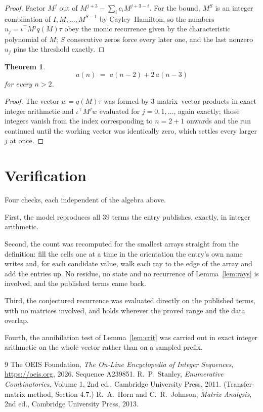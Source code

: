 \documentclass[11pt,a4paper]{article}
\theoremstyle{plain}
\newtheorem{theorem}{Theorem}
\theoremstyle{definition}
\begin{document}
\begin{proof}
Factor $M^{j}$ out of $M^{j+3}-\sum_ic_iM^{j+3-i}$. For the bound, $M^{S}$
is an integer combination of $I,M,\dots,M^{S-1}$ by Cayley--Hamilton, so the numbers
$u_j=\iota^{\!\top}M^{j}q(M)\tau$ obey the monic recurrence given by the characteristic
polynomial of $M$; $S$ consecutive zeros force every later one, and the last nonzero $u_j$
pins the threshold exactly.
\end{proof}

\begin{theorem}
\[
a(n)\;=\;a(n-2) + 2\,a(n-3)
\]
for every $n>2$.
\end{theorem}

\begin{proof}
The vector $w=q(M)\tau$ was formed by $3$ matrix--vector products in exact integer
arithmetic and $\iota^{\!\top}M^{j}w$ evaluated for $j=0,1,\dots$, again exactly; those
integers vanish from the index corresponding to $n=2+1$ onwards and the run continued
until the working vector was identically zero, which settles every larger $j$ at once.
\end{proof}

\section{Verification}

Four checks, each independent of the algebra above.

First, the model reproduces all $39$ terms the entry publishes, exactly, in integer
arithmetic.

Second, the count was recomputed for the smallest arrays straight from the definition: fill the
cells one at a time in the orientation the entry's own name writes and, for each candidate
value, walk each ray to the edge of the array and add the entries up. No residue, no state and
no recurrence of Lemma~\ref{lem:rays} is involved, and the published terms came back.

Third, the conjectured recurrence was evaluated directly on the published terms, with no
matrices involved, and holds wherever the proved range and the data overlap.

Fourth, the annihilation test of Lemma~\ref{lem:crit} was carried out in exact integer
arithmetic on the whole vector rather than on a sampled prefix.

\begin{thebibliography}{9}
 The OEIS Foundation, \emph{The On-Line Encyclopedia of Integer
Sequences}, \url{https://oeis.org}, 2026. Sequence A239851.
 R.~P.~Stanley, \emph{Enumerative Combinatorics}, Volume 1, 2nd ed.,
Cambridge University Press, 2011. (Transfer-matrix method, Section 4.7.)
 R.~A.~Horn and C.~R.~Johnson, \emph{Matrix Analysis}, 2nd ed., Cambridge
University Press, 2013.
\end{thebibliography}
\end{document}
